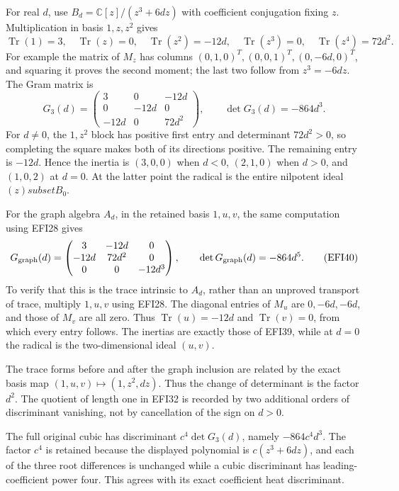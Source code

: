 \documentclass[
  10pt,
  a4paper,
]{article}
\begin{document}
For real \(d\), use \(B_d=\mathbb C[z]/(z^3+6dz)\) with coefficient
conjugation fixing \(z\). Multiplication in basis \(1,z,z^2\) gives \[
\operatorname{Tr}(1)=3,\quad
\operatorname{Tr}(z)=0,\quad
\operatorname{Tr}(z^2)=-12d,\quad
\operatorname{Tr}(z^3)=0,\quad
\operatorname{Tr}(z^4)=72d^2.
\tag{EFI38}
\] For example the matrix of \(M_z\) has columns
\((0,1,0)^T,(0,0,1)^T,(0,-6d,0)^T\), and squaring it proves the second
moment; the last two follow from \(z^3=-6dz\). The Gram matrix is \[
G_3(d)=
\begin{pmatrix}
3&0&-12d\\0&-12d&0\\-12d&0&72d^2
\end{pmatrix},
\qquad \det G_3(d)=-864d^3.
\tag{EFI39}
\] For \(d\ne0\), the \(1,z^2\) block has positive first entry and
determinant \(72d^2>0\), so completing the square makes both of its
directions positive. The remaining entry is \(-12d\). Hence the inertia
is \((3,0,0)\) when \(d<0\), \((2,1,0)\) when \(d>0\), and \((1,0,2)\)
at \(d=0\). At the latter point the radical is the entire nilpotent
ideal \((z)subset B_0\).

For the graph algebra \(A_d\), in the retained basis \(1,u,v\), the same
computation using EFI28 gives \[
G_{\rm graph}(d)=
\begin{pmatrix}
3&-12d&0\\-12d&72d^2&0\\0&0&-12d^3
\end{pmatrix},
\qquad \det G_{\rm graph}(d)=-864d^5.
\tag{EFI40}
\] To verify that this is the trace intrinsic to \(A_d\), rather than an
unproved transport of trace, multiply \(1,u,v\) using EFI28. The
diagonal entries of \(M_u\) are \(0,-6d,-6d\), and those of \(M_v\) are
all zero. Thus \(\operatorname{Tr}(u)=-12d\) and
\(\operatorname{Tr}(v)=0\), from which every entry follows. The inertias
are exactly those of EFI39, while at \(d=0\) the radical is the
two-dimensional ideal \((u,v)\).

The trace forms before and after the graph inclusion are related by the
exact basis map \((1,u,v)\mapsto(1,z^2,dz)\). Thus the change of
determinant is the factor \(d^2\). The quotient of length one in EFI32
is recorded by two additional orders of discriminant vanishing, not by
cancellation of the sign on \(d>0\).

The full original cubic has discriminant \(c^4\det G_3(d)\), namely
\(-864c^4d^3\). The factor \(c^4\) is retained because the displayed
polynomial is \(c(z^3+6dz)\), and each of the three root differences is
unchanged while a cubic discriminant has leading-coefficient power four.
This agrees with its exact coefficient heat discriminant.
\end{document}
